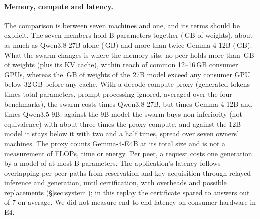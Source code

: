 \documentclass[11pt]{article}
\theoremstyle{definition}
\theoremstyle{remark}
\begin{document}
\paragraph{Memory, compute and latency.} The comparison is between seven machines and one, and its terms
should be explicit. The seven members hold \eFourSwarmParams{}B parameters together (\eFourSwarmGB{}\,GB of
\eFourQuant{} weights), about as much as Qwen3.8-27B alone (\eFourQwenTwentySevenGB{}\,GB) and more than twice
Gemma-4-12B (\eFourGemmaTwelveGB{}\,GB). What the swarm changes is where the memory sits: no peer holds more
than \eFourLargestPeerGB{}\,GB of weights (plus its KV cache), within reach of common 12--16\,GB consumer
GPUs, whereas the \eFourQwenTwentySevenGB{}\,GB of weights of the 27B model exceed any consumer GPU below
32\,GB before any cache. With a decode-compute proxy (generated tokens times total parameters, prompt
processing ignored, averaged over the four benchmarks), the swarm costs \eFourComputeQwenTwentySeven{} times
Qwen3.8-27B, but \eFourComputeGemmaTwelve{} times Gemma-4-12B and \eFourComputeQwenNine{} times Qwen3.5-9B:
against the 9B model the swarm buys non-inferiority (not equivalence) with about three times the proxy
compute, and against the 12B model it stays below it with two and a half times, spread over seven owners'
machines. The proxy counts Gemma-4-E4B at its total size and is not a measurement of FLOPs, time or
energy. Per peer, a request costs one generation by a model of at
most \eFourLargestPeerParams{}B parameters. The application's latency follows overlapping per-peer paths from
reservation and key acquisition
through relayed inference and generation, until certification, with overheads and possible replacements
(\S\ref{sec:system}); in this replay the certificate spared \eFourAvoidedMin{} to
\eFourAvoidedMax{} answers out of 7 on average. We did not measure end-to-end latency on consumer hardware
in E4.
\end{document}
